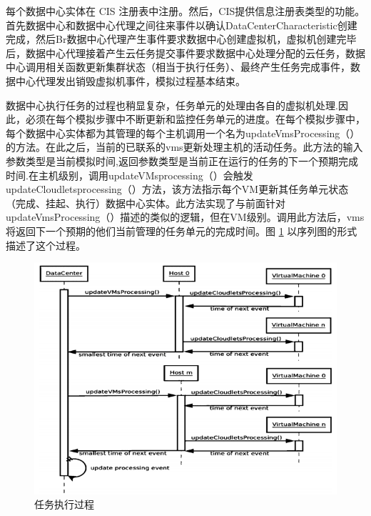 每个数据中心实体在 CIS 注册表中注册。然后，CIS提供信息注册表类型的功能。首先数据中心和数据中心代理之间往来事件以确认DataCenterCharacteristic创建完成，然后Br数据中心代理产生事件要求数据中心创建虚拟机，虚拟机创建完毕后，数据中心代理接着产生云任务提交事件要求数据中心处理分配的云任务，数据中心调用相关函数更新集群状态（相当于执行任务）、最终产生任务完成事件，数据中心代理发出销毁虚拟机事件，模拟过程基本结束。

数据中心执行任务的过程也稍显复杂，任务单元的处理由各自的虚拟机处理.因此，必须在每个模拟步骤中不断更新和监控任务单元的进度。在每个模拟步骤中，每个数据中心实体都为其管理的每个主机调用一个名为updateVmsProcessing（）的方法。在此之后，当前的已联系的vms更新处理主机的活动任务。此方法的输入参数类型是当前模拟时间,返回参数类型是当前正在运行的任务的下一个预期完成时间.在主机级别，调用updateVMsprocessing（）会触发updateCloudletsprocessing（）方法，该方法指示每个VM更新其任务单元状态（完成、挂起、执行）数据中心实体。此方法实现了与前面针对updateVmsProcessing（）描述的类似的逻辑，但在VM级别。调用此方法后，vms将返回下一个预期的他们当前管理的任务单元的完成时间。图 \ref{Fig:chap4_3} 以序列图的形式描述了这个过程。

\begin{figure}[ht]
  \centering
  \includegraphics{./Figure/IMG_Chap4_3.png}
  \caption{任务执行过程}\label{Fig:chap4_3}
\end{figure}

